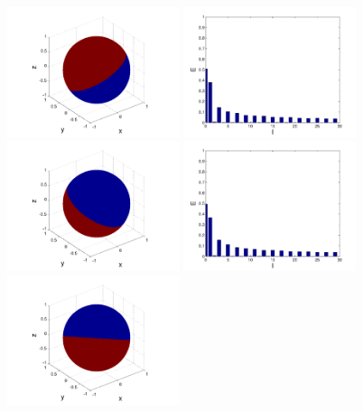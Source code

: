 \begin{figure}
\centering
\includegraphics[width=0.45\textwidth]{kugel/kSpektrum/Kugel_1_1.pdf}
\includegraphics[width=0.45\textwidth]{kugel/kSpektrum/Kugel_1_2.pdf}
\includegraphics[width=0.45\textwidth]{kugel/kSpektrum/Kugel_2_1.pdf}
\includegraphics[width=0.45\textwidth]{kugel/kSpektrum/Kugel_2_2.pdf}
\includegraphics[width=0.45\textwidth]{kugel/kSpektrum/Kugel_3_1.pdf}

\end{figure}
